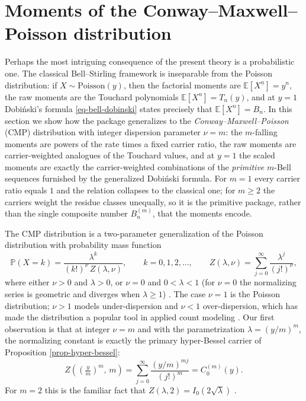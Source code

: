 \documentclass[a4paper]{amsart}
\numberwithin{equation}{section}
\begin{document}
\section{Moments of the Conway--Maxwell--Poisson distribution}\label{sec-cmp}

\noindent Perhaps the most intriguing consequence of the present theory is a probabilistic one. The classical Bell--Stirling framework is inseparable from the Poisson distribution: if $X \sim \mathrm{Poisson}(y)$, then the factorial moments are $\mathbb{E}\left[X^{\underline{n}}\right] = y^n$, the raw moments are the Touchard polynomials $\mathbb{E}[X^n] = T_n(y)$, and at $y = 1$ Dobi\'nski's formula \eqref{eq-bell-dobinski} states precisely that $\mathbb{E}[X^n] = B_n$. In this section we show how the package generalizes to the \emph{Conway--Maxwell--Poisson} (CMP) distribution with integer dispersion parameter $\nu = m$: the $m$-falling moments are powers of the rate times a fixed carrier ratio, the raw moments are carrier-weighted analogues of the Touchard values, and at $y = 1$ the scaled moments are exactly the carrier-weighted combinations of the \emph{primitive} $m$-Bell sequences furnished by the generalized Dobi\'nski formula. For $m = 1$ every carrier ratio equals $1$ and the relation collapses to the classical one; for $m \geq 2$ the carriers weight the residue classes unequally, so it is the primitive package, rather than the single composite number $B^{(m)}_n$, that the moments encode.

The CMP distribution \cite{conwayMaxwell1962, shmueliUsefulDistributionFitting2005} is a two-parameter generalization of the Poisson distribution with probability mass function
\[
\mathbb{P}(X = k) = \frac{\lambda^k}{(k!)^{\nu}\, Z(\lambda, \nu)}, \qquad k = 0, 1, 2, \ldots, \qquad Z(\lambda,\nu) = \sum_{j=0}^{\infty}\frac{\lambda^j}{(j!)^{\nu}},
\]
where either $\nu > 0$ and $\lambda > 0$, or $\nu = 0$ and $0 < \lambda < 1$ (for $\nu = 0$ the normalizing series is geometric and diverges when $\lambda \geq 1$) \cite{dalyGaunt2016}. The case $\nu=1$ is the Poisson distribution; $\nu > 1$ models under-dispersion and $\nu < 1$ over-dispersion, which has made the distribution a popular tool in applied count modeling \cite{shmueliUsefulDistributionFitting2005}. Our first observation is that at integer $\nu = m$ and with the parametrization $\lambda = (y/m)^m$, the normalizing constant is exactly the primary hyper-Bessel carrier of Proposition \ref{prop-hyper-bessel}:
\begin{equation}\label{eq-cmp-normalizer}
Z\!\left(\left(\tfrac{y}{m}\right)^{m},\, m\right) = \sum_{j=0}^\infty \frac{(y/m)^{mj}}{(j!)^m} = C^{(m)}_0(y).
\end{equation}
For $m = 2$ this is the familiar fact that $Z(\lambda, 2) = I_0(2\sqrt{\lambda})$ \cite{shmueliUsefulDistributionFitting2005, dalyGaunt2016}.
\end{document}
